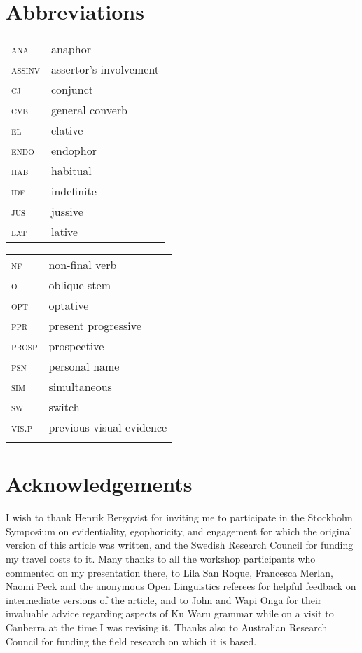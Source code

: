 \documentclass[output=paper]{langsci/langscibook}
\begin{document}
 
\section*{Abbreviations}
\begin{tabularx}{.45\textwidth}{lQ}
\textsc{ana} & anaphor\\
\textsc{assinv} & assertor’s involvement\\
\textsc{cj} & conjunct\\
\textsc{cvb} & general converb\\
\textsc{el} & elative\\
\textsc{endo} & endophor\\
\textsc{hab} & habitual\\
\textsc{idf} & indefinite\\
\textsc{jus} & jussive\\ 
\textsc{lat} & lative\\ 
\end{tabularx}
\begin{tabularx}{.45\textwidth}{lQ}
\textsc{nf} & non-final verb\\
\textsc{o} & oblique stem\\
\textsc{opt} & optative\\
\textsc{ppr} & present progressive\\
\textsc{prosp} & prospective\\
\textsc{psn} & personal name\\
\textsc{sim} & simultaneous\\
\textsc{sw} & switch\\
\textsc{vis.p} & previous visual evidence\\
\\
\end{tabularx}

\section*{Acknowledgements}
I wish to thank Henrik Bergqvist for inviting me to participate in the Stockholm Symposium on evidentiality, egophoricity, and engagement for which the original version of this article was written, and the Swedish Research Council for funding my travel costs to it. Many thanks to all the workshop participants who commented on my presentation there, to Lila San Roque, Francesca Merlan, Naomi Peck and the anonymous Open Linguistics referees for helpful feedback on intermediate versions of the article, and to John and Wapi Onga for their invaluable advice regarding aspects of Ku Waru grammar while on a visit to Canberra at the time I was revising it. Thanks also to Australian Research Council for funding the field research on which it is based. 


\sloppy
\printbibliography[heading=subbibliography,notkeyword=this] 
\end{document}
